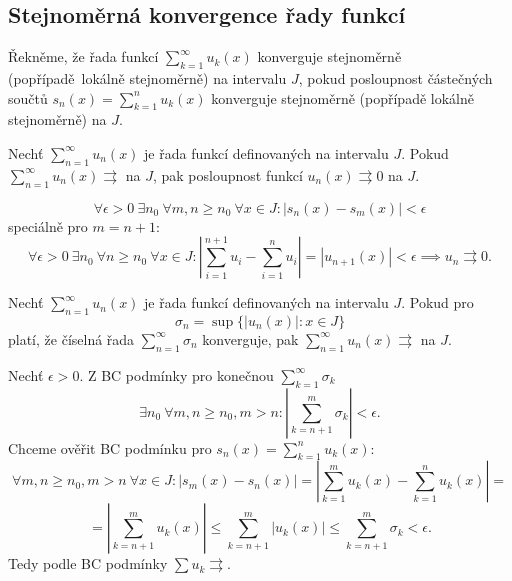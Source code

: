 \documentclass[12pt]{article}					%
\begin{document}
	\subsection{Stejnoměrná konvergence řady funkcí}
	\begin{definice}
		Řekněme, že řada funkcí $\sum_{k=1}^∞ u_k(x)$ konverguje stejnoměrně (popřípadě lokálně stejnoměrně) na intervalu $J$, pokud posloupnost částečných součtů $s_n(x) = \sum_{k=1}^n u_k(x)$ konverguje stejnoměrně (popřípadě lokálně stejnoměrně) na $J$.
	\end{definice}

	\begin{veta}
		Nechť $\sum_{n=1}^∞ u_n(x)$ je řada funkcí definovaných na intervalu $J$. Pokud $\sum_{n=1}^∞ u_n(x) \rightrightarrows$ na $J$, pak posloupnost funkcí $u_n(x) \rightrightarrows 0$ na $J$.

		\begin{dukazin}
			$$ \forall \epsilon > 0\ \exists n_0\ \forall m, n ≥ n_0\ \forall x \in J: |s_n(x) - s_m(x)| < \epsilon $$
			speciálně pro $m = n + 1$:
			$$ \forall \epsilon > 0\ \exists n_0\ \forall n ≥ n_0\ \forall x \in J: |\sum_{i=1}^{n+1} u_i - \sum_{i=1}^n u_i| = |u_{n+1}(x)| < \epsilon \implies u_n \rightrightarrows 0. $$
		\end{dukazin}
	\end{veta}

	\begin{veta}
		Nechť $\sum_{n=1}^∞ u_n(x)$ je řada funkcí definovaných na intervalu $J$. Pokud pro
		$$ \sigma_n = \sup\{|u_n(x)| : x \in J\} $$
		platí, že číselná řada $\sum_{n=1}^∞ \sigma_n$ konverguje, pak $\sum_{n=1}^∞ u_n(x) \rightrightarrows$ na $J$.

		\begin{dukazin}
%
%
			Nechť $\epsilon > 0$. Z BC podmínky pro konečnou $\sum_{k=1}^∞ \sigma_k$
			$$ \exists n_0\ \forall m, n ≥ n_0, m > n: |\sum_{k=n+1}^m \sigma_k| < \epsilon. $$
			Chceme ověřit BC podmínku pro $s_n(x) = \sum_{k=1}^n u_k(x)$:
			$$ \forall m, n ≥ n_0, m > n\ \forall x \in J: |s_m(x) - s_n(x)| = \left|\sum_{k=1}^m u_k(x) - \sum_{k=1}^n u_k(x)\right| = $$
			$$ = \left|\sum_{k=n+1}^m u_k(x)\right| ≤ \sum_{k=n+1}^m |u_k(x)| ≤ \sum_{k=n+1}^m \sigma_k < \epsilon. $$
			Tedy podle BC podmínky $\sum u_k \rightrightarrows$.
		\end{dukazin}
	\end{veta}
\end{document}
